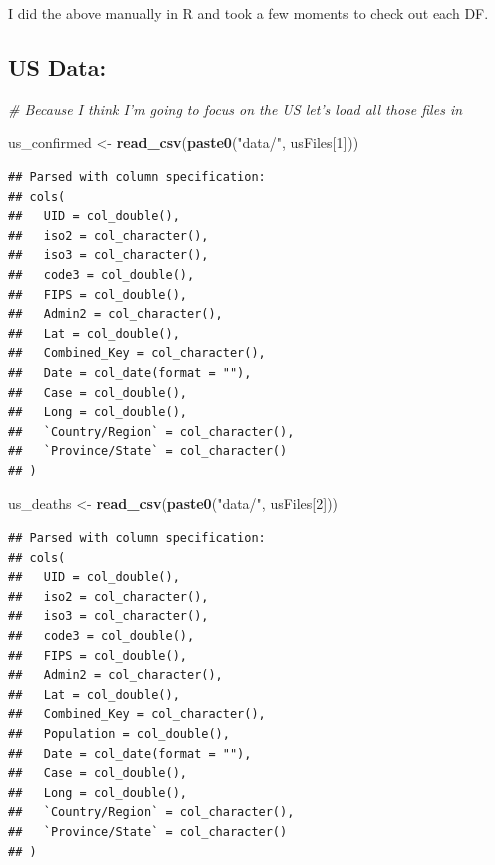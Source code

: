 \documentclass[
]{article}
\newenvironment{Shaded}{\begin{snugshade}}{\end{snugshade}}
\newcommand{\CommentTok}[1]{\textcolor[rgb]{0.56,0.35,0.01}{\textit{#1}}}
\newcommand{\DecValTok}[1]{\textcolor[rgb]{0.00,0.00,0.81}{#1}}
\newcommand{\KeywordTok}[1]{\textcolor[rgb]{0.13,0.29,0.53}{\textbf{#1}}}
\newcommand{\NormalTok}[1]{#1}
\newcommand{\StringTok}[1]{\textcolor[rgb]{0.31,0.60,0.02}{#1}}
\begin{document}
I did the above manually in R and took a few moments to check out each
DF.

\hypertarget{us-data}{%
\subsection{US Data:}\label{us-data}}

\begin{Shaded}
\begin{Highlighting}[]
\CommentTok{# Because I think I'm going to focus on the US let's load all those files in}

\NormalTok{us_confirmed <-}\StringTok{ }\KeywordTok{read_csv}\NormalTok{(}\KeywordTok{paste0}\NormalTok{(}\StringTok{"data/"}\NormalTok{, usFiles[}\DecValTok{1}\NormalTok{]))}
\end{Highlighting}
\end{Shaded}

\begin{verbatim}
## Parsed with column specification:
## cols(
##   UID = col_double(),
##   iso2 = col_character(),
##   iso3 = col_character(),
##   code3 = col_double(),
##   FIPS = col_double(),
##   Admin2 = col_character(),
##   Lat = col_double(),
##   Combined_Key = col_character(),
##   Date = col_date(format = ""),
##   Case = col_double(),
##   Long = col_double(),
##   `Country/Region` = col_character(),
##   `Province/State` = col_character()
## )
\end{verbatim}

\begin{Shaded}
\begin{Highlighting}[]
\NormalTok{us_deaths <-}\StringTok{ }\KeywordTok{read_csv}\NormalTok{(}\KeywordTok{paste0}\NormalTok{(}\StringTok{"data/"}\NormalTok{, usFiles[}\DecValTok{2}\NormalTok{]))}
\end{Highlighting}
\end{Shaded}

\begin{verbatim}
## Parsed with column specification:
## cols(
##   UID = col_double(),
##   iso2 = col_character(),
##   iso3 = col_character(),
##   code3 = col_double(),
##   FIPS = col_double(),
##   Admin2 = col_character(),
##   Lat = col_double(),
##   Combined_Key = col_character(),
##   Population = col_double(),
##   Date = col_date(format = ""),
##   Case = col_double(),
##   Long = col_double(),
##   `Country/Region` = col_character(),
##   `Province/State` = col_character()
## )
\end{verbatim}
\end{document}
